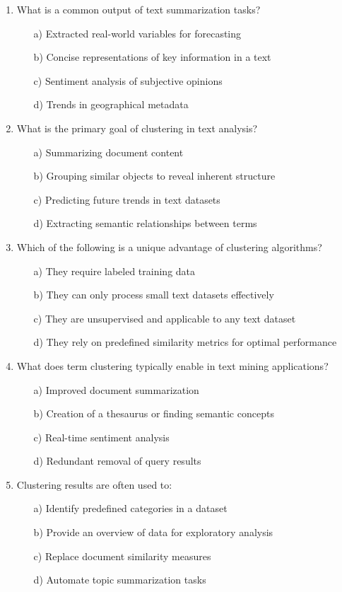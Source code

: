 \documentclass[8pt]{extarticle}
\begin{document}
\begin{multicols}{2}
\begin{enumerate}
\item What is a common output of text summarization tasks?
\begin{itemize}
\item[a)] Extracted real-world variables for forecasting
\item[b)] Concise representations of key information in a text
\item[c)] Sentiment analysis of subjective opinions
\item[d)] Trends in geographical metadata
\end{itemize}

\item What is the primary goal of clustering in text analysis?
\begin{itemize}
\item[a)] Summarizing document content
\item[b)] Grouping similar objects to reveal inherent structure
\item[c)] Predicting future trends in text datasets
\item[d)] Extracting semantic relationships between terms
\end{itemize}

\item Which of the following is a unique advantage of clustering algorithms?
\begin{itemize}
\item[a)] They require labeled training data
\item[b)] They can only process small text datasets effectively
\item[c)] They are unsupervised and applicable to any text dataset
\item[d)] They rely on predefined similarity metrics for optimal performance
\end{itemize}

\item What does term clustering typically enable in text mining applications?
\begin{itemize}
\item[a)] Improved document summarization
\item[b)] Creation of a thesaurus or finding semantic concepts
\item[c)] Real-time sentiment analysis
\item[d)] Redundant removal of query results
\end{itemize}

\item Clustering results are often used to:
\begin{itemize}
\item[a)] Identify predefined categories in a dataset
\item[b)] Provide an overview of data for exploratory analysis
\item[c)] Replace document similarity measures
\item[d)] Automate topic summarization tasks
\end{itemize}


\end{enumerate}
\end{multicols}
\end{document}
